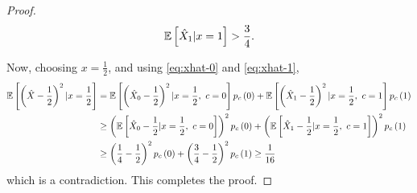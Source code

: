 \documentclass[twoside]{article}
\begin{document}
\begin{proof}
    \begin{equation}
        \mathbb{E}\left[ \hat{X}_1|x=1 \right] > \frac{3}{4}.
        \label{eq:xhat-1}
    \end{equation}

    Now, choosing \(x=\frac{1}{2}\), and using \eqref{eq:xhat-0} and \eqref{eq:xhat-1},
    \begin{align}
        \mathbb{E}\left[ \left(\hat{X}-\frac{1}{2}\right)^2|x=\frac{1}{2} \right] &= \mathbb{E}\left[ \left(\hat{X}_0 - \frac{1}{2}\right)^2|x=\frac{1}{2},\ c=0 \right]p_c\left(0\right) + \mathbb{E}\left[ \left(\hat{X}_1-\frac{1}{2}\right)^2|x=\frac{1}{2},\ c=1 \right]p_c\left(1\right) \\
                                                          &\ge \left(\mathbb{E}\left[ \hat{X}_0-\frac{1}{2}|x=\frac{1}{2},\ c=0 \right]\right)^2p_c\left(0\right) + \left(\mathbb{E}\left[ \hat{X}_1-\frac{1}{2}|x=\frac{1}{2},\ c=1 \right]\right)^2p_c\left(1\right) \\
                                                          &\ge \left(\frac{1}{4}-\frac{1}{2}\right)^2p_c\left(0\right) + \left(\frac{3}{4}-\frac{1}{2}\right)^2p_c\left(1\right) \ge \frac{1}{16}
                                                          \label{eq:mse-contradiction}
    \end{align}
    which is a contradiction. This completes the proof.
\end{proof}
\end{document}
